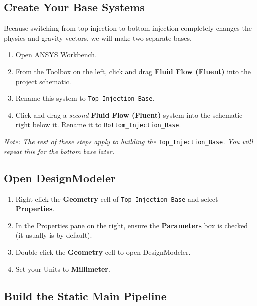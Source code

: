 \documentclass[12pt,a4paper]{report}
\begin{document}
\subsection{Create Your Base Systems}

Because switching from top injection to bottom injection completely changes the physics and gravity vectors, we will make two separate bases.

\begin{enumerate}
  \item Open ANSYS Workbench.
  \item From the Toolbox on the left, click and drag \textbf{Fluid Flow (Fluent)} into the project schematic.
  \item Rename this system to \texttt{Top\_Injection\_Base}.
  \item Click and drag a \textit{second} \textbf{Fluid Flow (Fluent)} system into the schematic right below it. Rename it to \texttt{Bottom\_Injection\_Base}.
\end{enumerate}

\textit{Note: The rest of these steps apply to building the} \texttt{Top\_Injection\_Base}\textit{. You will repeat this for the bottom base later.}

\subsection{Open DesignModeler}

\begin{enumerate}
  \item Right-click the \textbf{Geometry} cell of \texttt{Top\_Injection\_Base} and select \textbf{Properties}.
  \item In the Properties pane on the right, ensure the \textbf{Parameters} box is checked (it usually is by default).
  \item Double-click the \textbf{Geometry} cell to open DesignModeler.
  \item Set your Units to \textbf{Millimeter}.
\end{enumerate}

\subsection{Build the Static Main Pipeline}
\end{document}
